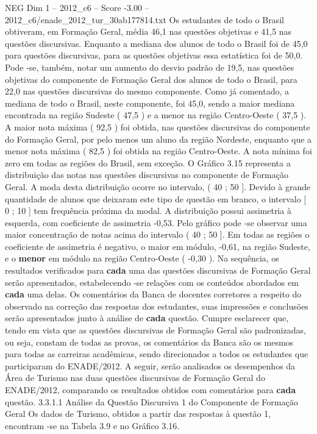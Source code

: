 \begin{textsample}{NEG Dim 1 – 2012\_c6 – Score -3.00 – 2012\_c6/enade\_2012\_tur\_30ab177814.txt}
Os estudantes de todo o Brasil obtiveram, em Formação Geral, média 46,1 nas questões objetivas e 41,5 nas questões discursivas.
Enquanto a mediana dos alunos de todo o Brasil foi de 45,0 para questões discursivas, para as questões objetivas essa estatística foi de 50,0.
Pode -se, também, notar um aumento do desvio padrão de 19,5, nas questões objetivas do componente de Formação Geral dos alunos de todo o Brasil, para 22,0 nas questões discursivas do mesmo componente.
Como já comentado, a mediana de todo o Brasil, neste componente, foi 45,0, sendo a maior mediana encontrada na região Sudeste ( 47,5 ) e a menor na região Centro-Oeste ( 37,5 ).
A maior nota máxima ( 92,5 ) foi obtida, nas questões discursivas do componente do Formação Geral, por pelo menos um aluno da região Nordeste, enquanto que a menor nota máxima ( 82,5 ) foi obtida na região Centro-Oeste.
A nota mínima foi zero em todas as regiões do Brasil, sem exceção.
O Gráfico 3.15 representa a distribuição das notas nas questões discursivas no componente de Formação Geral.
A moda desta distribuição ocorre no intervalo, ( 40 ; 50 ].
Devido à grande quantidade de alunos que deixaram este tipo de questão em branco, o intervalo [ 0 ; 10 ] tem frequência próxima da modal.
A distribuição possui assimetria à esquerda, com coeficiente de assimetria -0,53.
Pelo gráfico pode -se observar uma maior concentração de notas acima do intervalo ( 40 ; 50 ].
Em todas as regiões o coeficiente de assimetria é negativo, o maior em módulo, -0,61, na região Sudeste, e o \textbf{menor} em módulo na região Centro-Oeste ( -0,30 ).
Na sequência, os resultados verificados para \textbf{cada} uma das questões discursivas de Formação Geral serão apresentados, estabelecendo -se relações com os conteúdos abordados em \textbf{cada} uma delas.
Os comentários da Banca de docentes corretores a respeito do observado na correção das respostas dos estudantes, suas impressões e conclusões serão apresentados junto à análise de \textbf{cada} questão.
Cumpre esclarecer que, tendo em vista que as questões discursivas de Formação Geral são padronizadas, ou seja, constam de todas as provas, os comentários da Banca são os mesmos para todas as carreiras acadêmicas, sendo direcionados a todos os estudantes que participaram do ENADE/2012.
A seguir, serão analisados os desempenhos da Área de Turismo nas duas questões discursivas de Formação Geral do ENADE/2012, comparando os resultados obtidos com comentários para \textbf{cada} questão. 3.3.1.1 Análise da Questão Discursiva 1 do Componente de Formação Geral Os dados de Turismo, obtidos a partir das respostas à questão 1, encontram -se na Tabela 3.9 e no Gráfico 3.16.

\end{textsample}
